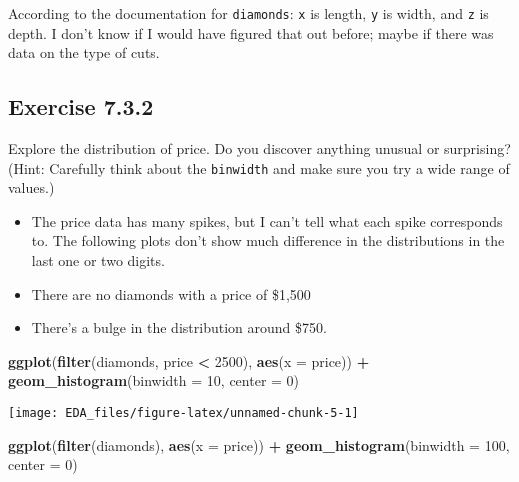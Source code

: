 \documentclass[]{book}
\newenvironment{Shaded}{\begin{snugshade}}{\end{snugshade}}
\newcommand{\DataTypeTok}[1]{\textcolor[rgb]{0.13,0.29,0.53}{#1}}
\newcommand{\DecValTok}[1]{\textcolor[rgb]{0.00,0.00,0.81}{#1}}
\newcommand{\KeywordTok}[1]{\textcolor[rgb]{0.13,0.29,0.53}{\textbf{#1}}}
\newcommand{\NormalTok}[1]{#1}
\newcommand{\OperatorTok}[1]{\textcolor[rgb]{0.81,0.36,0.00}{\textbf{#1}}}
\newcommand{\StringTok}[1]{\textcolor[rgb]{0.31,0.60,0.02}{#1}}
\providecommand{\tightlist}{%
  \setlength{\itemsep}{0pt}\setlength{\parskip}{0pt}}
\theoremstyle{plain}
\theoremstyle{remark}
\begin{document}
According to the documentation for \texttt{diamonds}: \texttt{x} is
length, \texttt{y} is width, and \texttt{z} is depth. I don't know if I
would have figured that out before; maybe if there was data on the type
of cuts.

\hypertarget{exercise-7.3.2}{%
\subsection*{\texorpdfstring{Exercise
{7.3.2}}{Exercise 7.3.2}}\label{exercise-7.3.2}}

Explore the distribution of price. Do you discover anything unusual or
surprising? (Hint: Carefully think about the \texttt{binwidth} and make
sure you try a wide range of values.)

\begin{itemize}
\tightlist
\item
  The price data has many spikes, but I can't tell what each spike
  corresponds to. The following plots don't show much difference in the
  distributions in the last one or two digits.
\item
  There are no diamonds with a price of \$1,500
\item
  There's a bulge in the distribution around \$750.
\end{itemize}

\begin{Shaded}
\begin{Highlighting}[]
\KeywordTok{ggplot}\NormalTok{(}\KeywordTok{filter}\NormalTok{(diamonds, price }\OperatorTok{<}\StringTok{ }\DecValTok{2500}\NormalTok{), }\KeywordTok{aes}\NormalTok{(}\DataTypeTok{x =}\NormalTok{ price)) }\OperatorTok{+}
\StringTok{  }\KeywordTok{geom_histogram}\NormalTok{(}\DataTypeTok{binwidth =} \DecValTok{10}\NormalTok{, }\DataTypeTok{center =} \DecValTok{0}\NormalTok{)}
\end{Highlighting}
\end{Shaded}

\begin{center}\texttt{[image: EDA\_files/figure-latex/unnamed-chunk-5-1]} \end{center}

\begin{Shaded}
\begin{Highlighting}[]
\KeywordTok{ggplot}\NormalTok{(}\KeywordTok{filter}\NormalTok{(diamonds), }\KeywordTok{aes}\NormalTok{(}\DataTypeTok{x =}\NormalTok{ price)) }\OperatorTok{+}
\StringTok{  }\KeywordTok{geom_histogram}\NormalTok{(}\DataTypeTok{binwidth =} \DecValTok{100}\NormalTok{, }\DataTypeTok{center =} \DecValTok{0}\NormalTok{)}
\end{Highlighting}
\end{Shaded}
\end{document}
